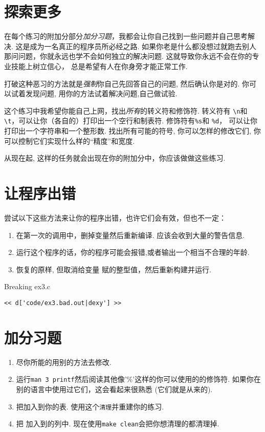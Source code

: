 \section{探索更多}

在每个练习的附加分部分\emph{加分习题}，我都会让你自己找到一些问题并自己思考解决. 这是成为一名真正的程序员所必经之路.  如果你老是什么都没想过就跑去别人那问问题，你就永远也学不会如何独立的解决问题. 这就导致你永远不会在你的专业技能上树立信心， 总是希望有人在你身旁才能正常工作.

打破这种恶习的方法就是\emph{强制}你自己先回答自己的问题, 然后确认你是对的. 你可以试着发现问题, 用你的方法试着解决问题,自己做试验.

这个练习中我希望你能自己上网，找出\emph{所有}的转义符和修饰符. 转义符有
\verb|\n|和 \verb|\t|，可以让你（各自的）打印出一个空行和制表符. 修饰符有\verb|%s|和 \verb|%d|， 可以让你打印出一个字符串和一个整形数.  找出所有可能的符号, 你可以怎样的修改它们, 你可以控制它们实现什么样的“精度”和宽度.

从现在起, 这样的任务就会出现在你的附加分中，你应该做做这些练习.

\section{让程序出错}

尝试以下这些方法来让你的程序出错，也许它们会有效，但也不一定：

\begin{enumerate}
\item 在第一次的调用中，删掉变量然后重新编译. 应该会收到大量的警告信息.
\item 运行这个程序的话，你的程序可能会报错,或者输出一个相当不合理的年龄.
\item 恢复的原样, 但取消给变量
    赋的整型值，然后重新构建并运行.
\end{enumerate}


\begin{Terminal}{Breaking ex3.c}
\begin{lstlisting}
<< d['code/ex3.bad.out|dexy'] >>
\end{lstlisting}
\end{Terminal}

\section{加分习题}

\begin{enumerate}
\item 尽你所能的用别的方法去修改.
\item 运行\verb|man 3 printf|然后阅读其他像'\%'这样的你可以使用的的修饰符. 如果你在别的语言中使用过它们，这会看起来很熟悉 (它们就是从来的).
\item 把加入到你的表. 使用这个\verb|清理|并重建你的练习.
\item 把 加入到的列中.
    现在使用\verb|make clean|会把你想清理的都清理掉.
\end{enumerate}


